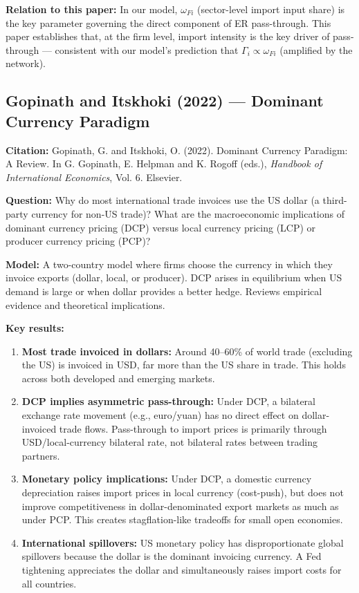 \documentclass[12pt]{article}
\begin{document}
\textbf{Relation to this paper:} In our model, $\omega_{Fi}$ (sector-level import input share) is the key parameter governing the direct component of ER pass-through. This paper establishes that, at the firm level, import intensity is the key driver of pass-through --- consistent with our model's prediction that $\Gamma_i \propto \omega_{Fi}$ (amplified by the network).

\subsection{Gopinath and Itskhoki (2022) --- Dominant Currency Paradigm}

\textbf{Citation:} Gopinath, G. and Itskhoki, O. (2022). Dominant Currency Paradigm: A Review. In G. Gopinath, E. Helpman and K. Rogoff (eds.), \textit{Handbook of International Economics}, Vol. 6. Elsevier.

\textbf{Question:} Why do most international trade invoices use the US dollar (a third-party currency for non-US trade)? What are the macroeconomic implications of dominant currency pricing (DCP) versus local currency pricing (LCP) or producer currency pricing (PCP)?

\textbf{Model:} A two-country model where firms choose the currency in which they invoice exports (dollar, local, or producer). DCP arises in equilibrium when US demand is large or when dollar provides a better hedge. Reviews empirical evidence and theoretical implications.

\textbf{Key results:}
\begin{enumerate}
    \item \textbf{Most trade invoiced in dollars:} Around 40--60\% of world trade (excluding the US) is invoiced in USD, far more than the US share in trade. This holds across both developed and emerging markets.
    \item \textbf{DCP implies asymmetric pass-through:} Under DCP, a bilateral exchange rate movement (e.g., euro/yuan) has no direct effect on dollar-invoiced trade flows. Pass-through to import prices is primarily through USD/local-currency bilateral rate, not bilateral rates between trading partners.
    \item \textbf{Monetary policy implications:} Under DCP, a domestic currency depreciation raises import prices in local currency (cost-push), but does not improve competitiveness in dollar-denominated export markets as much as under PCP. This creates stagflation-like tradeoffs for small open economies.
    \item \textbf{International spillovers:} US monetary policy has disproportionate global spillovers because the dollar is the dominant invoicing currency. A Fed tightening appreciates the dollar and simultaneously raises import costs for all countries.
\end{enumerate}
\end{document}
